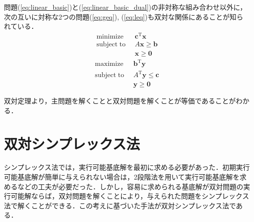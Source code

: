 \documentclass{jsreport}
\begin{document}
問題(\ref{eq:linear_basic})と(\ref{eq:linear_basic_dual})の非対称な組み合わせ以外に，次の互いに対称な2つの問題(\ref{eq:geq}), (\ref{eq:leq})も双対な関係にあることが知られている．
\begin{align}\label{eq:geq}
  \mathrm{minimize} \; \; &\bm{c}^{\mathrm{T}}\bm{x} \nonumber \\
  \mathrm{subject \; to} \; \; &A\bm{x} \geq \bm{b} \\
  &\bm{x} \geq \bm{0} \nonumber
\end{align}
\begin{align}\label{eq:leq}
  \mathrm{maximize} \; \; &\bm{b}^{\mathrm{T}}\bm{y} \nonumber \\
  \mathrm{subject \; to} \; \; &A^{\mathrm{T}}\bm{y} \leq \bm{c} \\
  &\bm{y} \geq \bm{0} \nonumber
\end{align}

双対定理より，主問題を解くことと双対問題を解くことが等価であることがわかる．

\section{双対シンプレックス法}
シンプレックス法では，実行可能基底解を最初に求める必要があった．初期実行可能基底解が簡単に与えられない場合は，2段階法を用いて実行可能基底解を求めるなどの工夫が必要だった．しかし，容易に求められる基底解が双対問題の実行可能解ならば，双対問題を解くことにより，与えられた問題をシンプレックス法で解くことができる．この考えに基づいた手法が双対シンプレックス法である．
\end{document}
